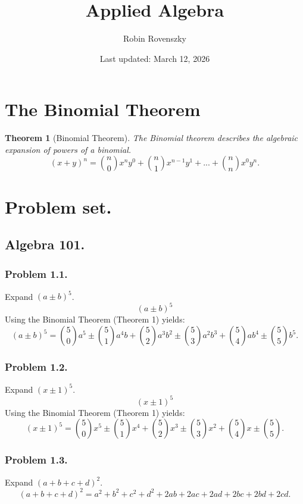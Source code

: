 \documentclass{article}
\title{Applied Algebra}
\author{Robin Rovenszky}
\date{Last updated: March 12, 2026}
\newtheorem{theorem}{Theorem}
\begin{document}
\maketitle
\tableofcontents
\newpage

\section{The Binomial Theorem}
\begin{theorem}[Binomial Theorem]
The Binomial theorem describes the algebraic expansion of powers of a binomial.
\begin{equation}
    (x+y)^n = \binom{n}{0}x^ny^0 + \binom{n}{1}x^{n-1}y^1 + ... + \binom{n}{n}x^0y^n.
\end{equation}
\end{theorem}

\section{Problem set.}
\subsection{Algebra 101.}
\subsubsection{Problem 1.1.}
Expand $(a\pm b)^5$.
\begin{equation}
    (a \pm b)^5
\end{equation}
Using the Binomial Theorem (Theorem 1) yields:
\begin{equation}
    (a \pm b)^5 = \binom{5}{0}a^5 \pm \binom{5}{1}a^4b + \binom{5}{2}a^3b^2 \pm \binom{5}{3}a^2b^3 + \binom{5}{4}ab^4 \pm \binom{5}{5}b^5.
\end{equation}

\subsubsection{Problem 1.2.}
Expand $(x\pm 1)^5$.
\begin{equation}
    (x \pm 1)^5
\end{equation}
Using the Binomial Theorem (Theorem 1) yields:
\begin{equation}
    (x \pm 1)^5 = \binom{5}{0}x^5\pm \binom{5}{1}x^4 + \binom{5}{2}x^3 \pm \binom{5}{3}x^2 + \binom{5}{4}x \pm \binom{5}{5}.
\end{equation}

\subsubsection{Problem 1.3.}
Expand $(a+b+c+d)^2$.
\begin{equation}
    (a+b+c+d)^2 = a^2 + b^2 + c^2 + d^2 + 2ab + 2ac + 2ad + 2bc + 2bd + 2cd.
\end{equation}
\end{document}

